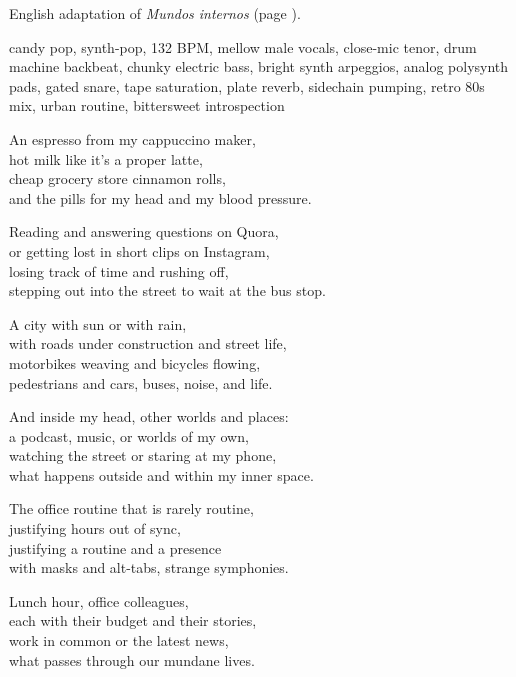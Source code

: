 
\begin{notes}
English adaptation of \emph{Mundos internos} (page \pageref{sec:mundos-internos}).
\end{notes}
\begin{style}
candy pop, synth-pop, 132 BPM, mellow male vocals, close-mic tenor, drum machine backbeat, chunky electric bass, bright synth arpeggios, analog polysynth pads, gated snare, tape saturation, plate reverb, sidechain pumping, retro 80s mix, urban routine, bittersweet introspection
\end{style}
\begin{lyrics}
An espresso from my cappuccino maker,\\
hot milk like it’s a proper latte,\\
cheap grocery store cinnamon rolls,\\
and the pills for my head and my blood pressure.

Reading and answering questions on Quora,\\
or getting lost in short clips on Instagram,\\
losing track of time and rushing off,\\
stepping out into the street to wait at the bus stop.

A city with sun or with rain,\\
with roads under construction and street life,\\
motorbikes weaving and bicycles flowing,\\
pedestrians and cars, buses, noise, and life.

And inside my head, other worlds and places:\\
a podcast, music, or worlds of my own,\\
watching the street or staring at my phone,\\
what happens outside and within my inner space.

The office routine that is rarely routine,\\
justifying hours out of sync,\\
justifying a routine and a presence\\
with masks and alt-tabs, strange symphonies.

Lunch hour, office colleagues,\\
each with their budget and their stories,\\
work in common or the latest news,\\
what passes through our mundane lives.


\end{lyrics}
